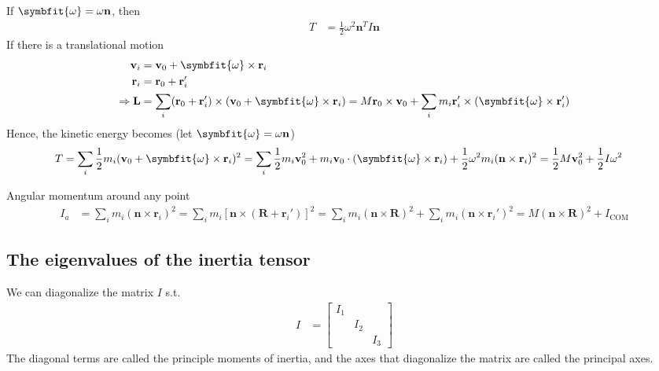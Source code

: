 \documentclass[twoside,9pt]{article}
\numberwithin{equation}{section} %
\theoremstyle{definition}
\theoremstyle{remark}
\begin{document}
If $\symbfit{\omega}=\omega\mathbf{n}$, then
\begin{align}
    T &= \frac{1}{2}\omega^2\mathbf{n}^TI\mathbf{n}
\end{align}
If there is a translational motion
\begin{align}
    \mathbf{v}_i &= \mathbf{v}_0 + \symbfit{\omega}\times\mathbf{r}_i\\
    \mathbf{r}_i &= \mathbf{r}_0 + \mathbf{r}_i'\\
    \Rightarrow\mathbf{L}
    &= \sum_i(\mathbf{r}_0+\mathbf{r}_i')\times(\mathbf{v}_0 + \symbfit{\omega}
    \times\mathbf{r}_i)
    = M\mathbf{r}_0\times\mathbf{v}_0 
    + \sum_i m_i\mathbf{r}_i'\times(\symbfit{\omega}\times\mathbf{r}_i')
\end{align}
Hence, the kinetic energy becomes
(let $\symbfit{\omega}=\omega\mathbf{n}$)
\begin{align}
    T &= \sum_i \frac{1}{2}m_i(\mathbf{v}_0 + \symbfit{\omega}\times\mathbf{r}_i)^2
    = \sum_i \frac{1}{2}m_i\mathbf{v}_0^2 + m_i\mathbf{v}_0\cdot
    (\symbfit{\omega}\times\mathbf{r}_i)
    + \frac{1}{2}\omega^2m_i(\mathbf{n}\times\mathbf{r}_i)^2
    = \frac{1}{2}M\mathbf{v}_0^2 + \frac{1}{2}I\omega^2
\end{align}

Angular momentum around any point
\begin{align}
    I_a &= \sum_i m_i(\mathbf{n}\times\mathbf{r}_i)^2
    = \sum_i m_i[\mathbf{n}\times(\mathbf{R} + \mathbf{r}_i')]^2
    = \sum_i m_i(\mathbf{n}\times\mathbf{R})^2 + \sum_i m_i(\mathbf{n}\times
    \mathbf{r}_i')^2
    = M(\mathbf{n}\times\mathbf{R})^2 + I_\text{COM}
\end{align}

\subsection{The eigenvalues of the inertia tensor}
We can diagonalize the matrix $I$ s.t.
\begin{align}
    I &= \begin{bmatrix}
        I_1 & & \\
        & I_2 & \\
        & & I_3
    \end{bmatrix}
\end{align}
The diagonal terms are called the principle moments of inertia,
and the axes that diagonalize the matrix are called the
principal axes.


\end{document}
